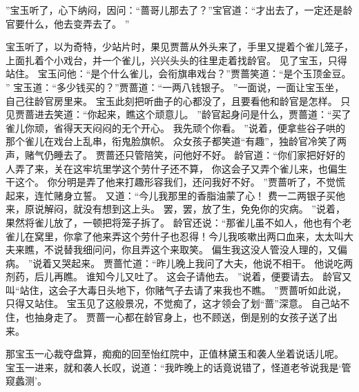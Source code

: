 ”宝玉听了，心下纳闷，因问：“蔷哥儿那去了？”宝官道：“才出去了，一定还是龄官要什么，他去变弄去了。
”\par
宝玉听了，以为奇特，少站片时，果见贾蔷从外头来了，手里又提着个雀儿笼子，上面扎着个小戏台，并一个雀儿，兴兴头头的往里走着找龄官。
见了宝玉，只得站住。
宝玉问他：“是个什么雀儿，会衔旗串戏台？”贾蔷笑道：“是个玉顶金豆。
”
宝玉道：“多少钱买的？”贾蔷道：“一两八钱银子。
”一面说，一面让宝玉坐，自己往龄官房里来。
宝玉此刻把听曲子的心都没了，且要看他和龄官是怎样。
只见贾蔷进去笑道：“你起来，瞧这个顽意儿。
”龄官起身问是什么，贾蔷道：“买了雀儿你顽，省得天天闷闷的无个开心。
我先顽个你看。
”说着，便拿些谷子哄的那个雀儿在戏台上乱串，衔鬼脸旗帜。
众女孩子都笑道“有趣”，独龄官冷笑了两声，赌气仍睡去了。
贾蔷还只管陪笑，问他好不好。
龄官道：“你们家把好好的人弄了来，关在这牢坑里学这个劳什子还不算，
你这会子又弄个雀儿来，也偏生干这个。
你分明是弄了他来打趣形容我们，还问我好不好。
”贾蔷听了，不觉慌起来，连忙赌身立誓。
又道：“今儿我那里的香脂油蒙了心！
费一二两银子买他来，原说解闷，就没有想到这上头。
罢，罢，放了生，免免你的灾病。
”说着，果然将雀儿放了，一顿把将笼子拆了。
龄官还说：“那雀儿虽不如人，他也有个老雀儿在窝里，你拿了他来弄这个劳什子也忍得！今儿我咳嗽出两口血来，太太叫大夫来瞧，不说替我细问问，你且弄这个来取笑。
偏生我这没人管没人理的，又偏病。
”说着又哭起来。
贾蔷忙道：“昨儿晚上我问了大夫，他说不相干。
他说吃两剂药，后儿再瞧。
谁知今儿又吐了。
这会子请他去。
”说着，便要请去。
龄官又叫“站住，这会子大毒日头地下，你赌气子去请了来我也不瞧。
”贾蔷听如此说，只得又站住。
宝玉见了这般景况，不觉痴了，这才领会了划“蔷”深意。
自己站不住，也抽身走了。
贾蔷一心都在龄官身上，也不顾送，倒是别的女孩子送了出来。
\par
那宝玉一心裁夺盘算，痴痴的回至怡红院中，正值林黛玉和袭人坐着说话儿呢。
宝玉一进来，就和袭人长叹，说道：“我昨晚上的话竟说错了，怪道老爷说我是‘管窥蠡测’。
